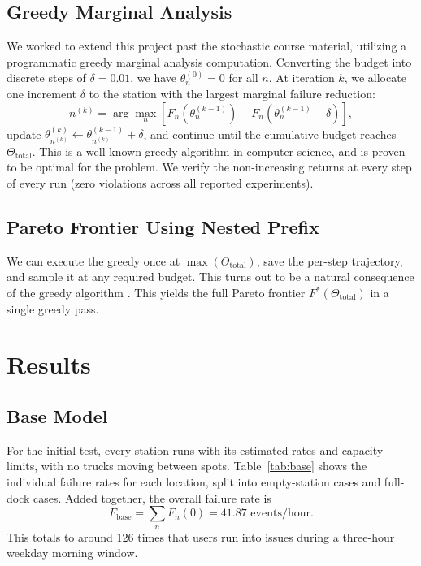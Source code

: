 \documentclass[conference]{IEEEtran}
\begin{document}
\subsection{Greedy Marginal Analysis}
We worked to extend this project past the stochastic course material, utilizing a programmatic greedy marginal analysis computation. Converting the budget into discrete steps of $\delta = 0.01$, we have $\theta_n^{(0)} = 0$ for all $n$. At iteration $k$, we allocate one increment $\delta$ to the station with the largest marginal failure reduction:
\begin{equation}\label{eq:greedy}
n^{(k)} = \arg\max_n \left[ F_n(\theta_n^{(k-1)}) - F_n(\theta_n^{(k-1)} + \delta) \right],
\end{equation}
update $\theta_{n^{(k)}}^{(k)} \leftarrow \theta_{n^{(k)}}^{(k-1)} + \delta$, and continue until the cumulative budget reaches $\Theta_{\text{total}}$. This is a well known greedy algorithm in computer science, and is proven to be optimal for the problem. We verify the non-increasing returns at every step of every run (zero violations across all reported experiments).
\subsection{Pareto Frontier Using Nested Prefix}

We can execute the greedy once at $\max(\Theta_{\text{total}})$, save the per-step trajectory, and sample it at any required budget. This turns out to be a natural consequence of the greedy algorithm \cite{claude}. This yields the full Pareto frontier $F^*(\Theta_{\text{total}})$ in a single greedy pass.

\section{Results}\label{sec:results}

\subsection{Base Model}

For the initial test, every station runs with its estimated rates and capacity limits, with no trucks moving between spots. Table~\ref{tab:base} shows the individual failure rates for each location, split into empty-station cases and full-dock cases. Added together, the overall failure rate is
\[
F_{\text{base}} = \sum_n F_n(0) = 41.87 \text{ events/hour}.
\]
This totals to around 126 times that users run into issues during a three-hour weekday morning window.
\end{document}
